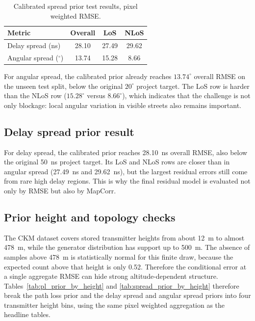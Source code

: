 \begin{table}[!htbp]
\centering
\caption{Calibrated spread prior test results, pixel weighted RMSE.}
\label{tab:spread_prior_results}
\begin{tabular}{lccc}
\toprule
Metric & Overall & LoS & NLoS \\
\midrule
Delay spread (ns) & 28.10 & 27.49 & 29.62 \\
Angular spread ($^\circ$) & 13.74 & 15.28 & 8.66 \\
\bottomrule
\end{tabular}
\end{table}

For angular spread, the calibrated prior already reaches \(13.74^\circ\)
overall RMSE on the unseen test split, below the original \(20^\circ\) project
target. The LoS row is harder than the NLoS row (\(15.28^\circ\) versus
\(8.66^\circ\)), which indicates that the challenge is not only blockage: local
angular variation in visible streets also remains important.

\subsection{Delay spread prior result}

For delay spread, the calibrated prior reaches \SI{28.10}{ns} overall RMSE,
also below the original \SI{50}{ns} project target. Its LoS and NLoS rows are
closer than in angular spread (\SI{27.49}{ns} and \SI{29.62}{ns}), but the
largest residual errors still come from rare high delay regions. This is why the
final residual model is evaluated not only by RMSE but also by MapCorr.

\subsection{Prior height and topology checks}

The CKM dataset covers stored transmitter heights from about \SI{12}{m} to almost
\SI{478}{m}, while the generator distribution has support up to
\SI{500}{m}. The absence of samples above \SI{478}{m} is statistically normal
for this finite draw, because the expected count above that height is only
0.52. Therefore the conditional error at a single aggregate RMSE can hide
strong altitude-dependent structure. Tables~\ref{tab:pl_prior_by_height} and
\ref{tab:spread_prior_by_height} therefore break the path loss prior and the
delay spread and angular spread priors into four transmitter height bins, using the
same pixel weighted aggregation as the headline tables.

